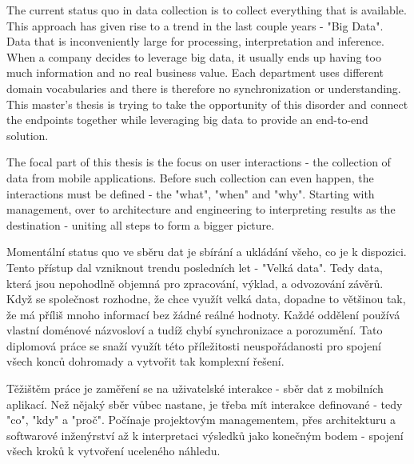 \documentclass[11pt,twoside,a4paper]{book}
\begin{document}
\abstractpage

The current status quo in data collection is to collect everything that is available. This approach has given rise to a trend in the last couple years - "Big Data". Data that is inconveniently large for processing, interpretation and inference. When a company decides to leverage big data, it usually ends up having too much information and no real business value. Each department uses different domain vocabularies and there is therefore no synchronization or understanding. This master's thesis is trying to take the opportunity of this disorder and connect the endpoints together while leveraging big data to provide an end-to-end solution.

The focal part of this thesis is the focus on user interactions - the collection of data from mobile applications. Before such collection can even happen, the interactions must be defined - the "what", "when" and "why". Starting with management, over to architecture and engineering to interpreting results as the destination - uniting all steps to form a bigger picture.



\baselineskip

\noindent
Momentální status quo ve sběru dat je sbírání a ukládání všeho, co je k dispozici. Tento přístup dal vzniknout trendu posledních let - "Velká data". Tedy data, která jsou  nepohodlně objemná pro zpracování, výklad, a odvozování závěrů. Když se společnost rozhodne, že chce využít velká data, dopadne to většinou tak, že má příliš mnoho informací bez žádné reálné hodnoty. Každé oddělení používá vlastní doménové názvosloví a tudíž chybí synchronizace a porozumění. Tato diplomová práce se snaží využít této příležitosti neuspořádanosti pro spojení všech konců dohromady a vytvořit tak komplexní řešení.

Těžištěm práce je zaměření se na uživatelské interakce - sběr dat z mobilních aplikací. Než nějaký sběr vůbec nastane, je třeba mít interakce definované - tedy "co", "kdy" a "proč". Počínaje projektovým managementem, přes architekturu a softwarové inženýrství až k interpretaci výsledků jako konečným bodem - spojení všech kroků k vytvoření uceleného náhledu.



\tableofcontents


\end{document}
